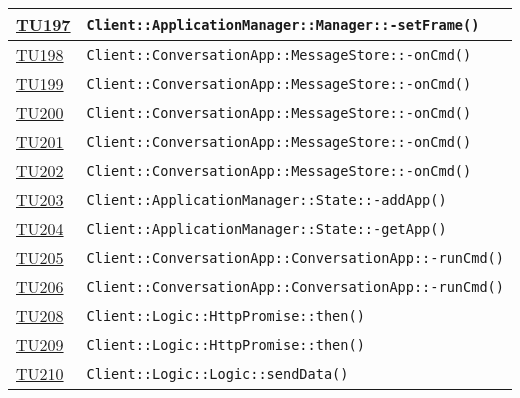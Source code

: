 \begin{longtable}{|>{\centering}m{1cm}|m{12cm}<{\centering}|}
\hyperlink{TU197}{TU197} & \texttt{Client::ApplicationManager::Manager::-\linebreak setFrame()}\\ \hline

\hyperlink{TU198}{TU198} & \texttt{Client::ConversationApp::MessageStore::-\linebreak onCmd()}\\ \hline

\hyperlink{TU199}{TU199} & \texttt{Client::ConversationApp::MessageStore::-\linebreak onCmd()}\\ \hline

\hyperlink{TU200}{TU200} & \texttt{Client::ConversationApp::MessageStore::-\linebreak onCmd()}\\ \hline

\hyperlink{TU201}{TU201} & \texttt{Client::ConversationApp::MessageStore::-\linebreak onCmd()}\\ \hline

\hyperlink{TU202}{TU202} & \texttt{Client::ConversationApp::MessageStore::-\linebreak onCmd()}\\ \hline

\hyperlink{TU203}{TU203} & \texttt{Client::ApplicationManager::State::-\linebreak addApp()}\\ \hline

\hyperlink{TU204}{TU204} & \texttt{Client::ApplicationManager::State::-\linebreak getApp()}\\ \hline

\hyperlink{TU205}{TU205} & \texttt{Client::ConversationApp::ConversationApp::-\linebreak runCmd()}\\ \hline

\hyperlink{TU206}{TU206} & \texttt{Client::ConversationApp::ConversationApp::-\linebreak runCmd()}\\ \hline

\hyperlink{TU208}{TU208} & \texttt{Client::Logic::HttpPromise::then()}\\ \hline

\hyperlink{TU209}{TU209} & \texttt{Client::Logic::HttpPromise::then()}\\ \hline

\hyperlink{TU210}{TU210} & \texttt{Client::Logic::Logic::sendData()}\\ \hline


\end{longtable}
